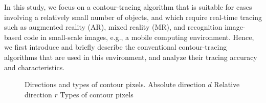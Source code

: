 In this study, we focus on a contour-tracing algorithm that is suitable for cases involving a relatively small number of objects, and which require real-time tracing such as augmented reality (AR), mixed reality (MR), and recognition image-based code in small-scale images, e.g., a mobile computing environment. Hence, we first introduce and briefly describe the conventional contour-tracing algorithms that are used in this environment, and analyze their tracing accuracy and characteristics. 

\begin{figure}[htbp]
	\centering
	 
	\caption{Directions and types of contour pixels. \protect{} Absolute direction $d$ \protect{} Relative direction $r$ \protect{} Types of contour pixels}
	\label{fig:image2}
\end{figure}


